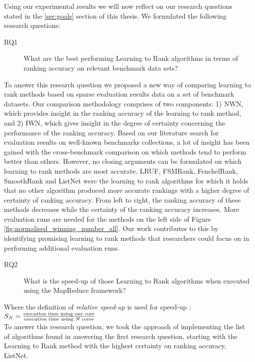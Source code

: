 Using our experimental results we will now reflect on our research questions stated in the \ref{sec:goals} section of this thesis. We formulated the following research questions:
\begin{description}
\item[RQ1] What are the best performing Learning to Rank algorithms in terms of ranking accuracy on relevant benchmark data sets?
\end{description}
To answer this research question we proposed a new way of comparing learning to rank methods based on sparse evaluation results data on a set of benchmark datasets. Our comparison methodology comprises of two components: 1) NWN, which provides insight in the ranking accuracy of the learning to rank method, and 2) IWN, which gives insight in the degree of certainty concerning the performance of the ranking accuracy. Based on our literature search for evaluation results on well-known benchmarks collections, a lot of insight has been gained with the cross-benchmark comparison on which methods tend to perform better than others. However, no closing arguments can be formulated on which learning to rank methods are most accurate. LRUF, FSMRank, FenchelRank, SmoothRank and ListNet were the learning to rank algorithms for which it holds that no other algorithm produced more accurate rankings with a higher degree of certainty of ranking accuracy. From left to right, the ranking accuracy of these methods decreases while the certainty of the ranking accuracy increases. More evaluation runs are needed for the methods on the left side of Figure \ref{fig:normalised_winning_number_all}. Our work contributes to this by identifying promising learning to rank methods that researchers could focus on in performing additional evaluation runs.

\begin{description}
\item[RQ2] What is the speed-up of those Learning to Rank algorithms when executed using the MapReduce framework?
\end{description}
\bigskip
Where the definition of \emph{relative speed-up} is used for speed-up \cite{Sun1991}:\\

$S_N = \frac{\text{execution time using one core}}{\text{execution time using \emph{N} cores}}$\\

To answer this research question, we took the approach of implementing the list of algorithms found in answering the first research question, starting with the Learning to Rank method with the highest certainty on ranking accuracy, ListNet.\\

